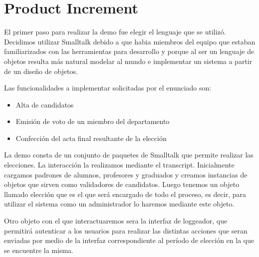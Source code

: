 \section{Product Increment}

El primer paso para realizar la demo fue elegir el lenguaje que se utiliz\'o.
Decidimos utilizar Smalltalk debido a que habia miembros del equipo que estaban familiarizados con las herramientas para desarrollo 
y porque al ser un lenguaje de objetos resulta m\'as natural modelar al mundo e implementar un sistema a partir de un dise\~no de objetos.

\medskip

Las funcionalidades a implementar solicitadas por el enunciado son:
\begin{itemize}
 \item Alta de candidatos
 \item Emisi\'on de voto de un miembro del departamento
 \item Confecci\'on del acta final resultante de la elecci\'on
\end{itemize}

\medskip

La demo consta de un conjunto de paquetes de Smalltalk que permite realizar las elecciones.
La interacci\'on la realizamos mediante el transcript. Inicialmente cargamos padrones de alumnos, profesores y graduados y creamos instancias de objetos
que sirven como validadores de candidatos. Luego tenemos un objeto llamado elecci\'on que es el que ser\'a encargado de todo el proceso, es decir,
para utilizar el sistema como un administrador lo haremos mediante este objeto.

Otro objeto con el que interactuaremos sera la interfaz de loggeador, que permitir\'a autenticar
a los usuarios para realizar las distintas acciones que seran enviadas por medio de la interfaz correspondiente al per\'iodo de elecci\'on en la que se
encuentre la misma.

